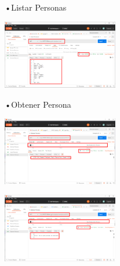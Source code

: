 \documentclass[twoside,twocolumn]{article}
\begin{document}
 
•Listar Personas
\begin{center}
	\includegraphics[width=5cm]{./img/9.png} 
\end{center}
 
•Obtener Persona

\begin{center}
	\includegraphics[width=5cm]{./img/10.png} 
\end{center}
\begin{center}
	\includegraphics[width=5cm]{./img/11.png} 
\end{center}
 
\end{document}
